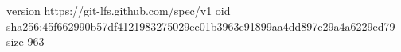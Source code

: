 version https://git-lfs.github.com/spec/v1
oid sha256:45f662990b57df4121983275029ee01b3963c91899aa4dd897c29a4a6229ed79
size 963
